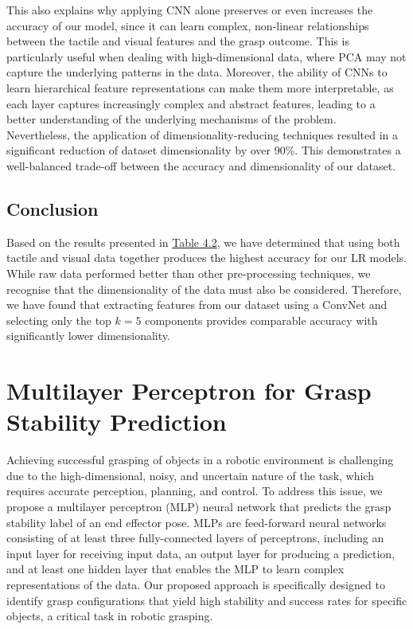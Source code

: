 \documentclass[11pt, a4paper]{report}
\begin{document}
This also explains why applying CNN alone preserves or even increases the accuracy of our model, since it can learn complex, non-linear relationships between the tactile and visual features and the grasp outcome. This is particularly useful when dealing with high-dimensional data, where PCA may not capture the underlying patterns in the data. Moreover, the ability of CNNs to learn hierarchical feature representations can make them more interpretable, as each layer captures increasingly complex and abstract features, leading to a better understanding of the underlying mechanisms of the problem.\\

Nevertheless, the application of dimensionality-reducing techniques resulted in a significant reduction of dataset dimensionality by over 90\%. This demonstrates a well-balanced trade-off between the accuracy and dimensionality of our dataset.

\section{Conclusion}\label{sec:4.6}
Based on the results presented in \hyperref[tbl:4.2]{Table 4.2}, we have determined that using both tactile and visual data together produces the highest accuracy for our LR models. While raw data performed better than other pre-processing techniques, we recognise that the dimensionality of the data must also be considered. Therefore, we have found that extracting features from our dataset using a ConvNet and selecting only the top $k=5$ components provides comparable accuracy with significantly lower dimensionality.



\chapter{Multilayer Perceptron for Grasp Stability Prediction}\label{chap:5}
Achieving successful grasping of objects in a robotic environment is challenging due to the high-dimensional, noisy, and uncertain nature of the task, which requires accurate perception, planning, and control. To address this issue, we propose a multilayer perceptron (MLP) neural network that predicts the grasp stability label of an end effector pose. MLPs are feed-forward neural networks consisting of at least three fully-connected layers of perceptrons, including an input layer for receiving input data, an output layer for producing a prediction, and at least one hidden layer that enables the MLP to learn complex representations of the data. Our proposed approach is specifically designed to identify grasp configurations that yield high stability and success rates for specific objects, a critical task in robotic grasping.\\
\end{document}
